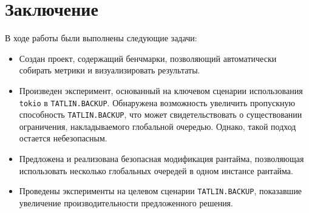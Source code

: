 
\section{Заключение}

В ходе работы были выполнены следующие задачи:

\begin{itemize}
    \item Создан проект, содержащий бенчмарки, позволяющий автоматически собирать метрики и визуализировать результаты.
    \item Произведен эксперимент, основанный на ключевом сценарии использования \verb|tokio| в \verb|TATLIN.BACKUP|. Обнаружена возможность увеличить пропускную способность \verb|TATLIN.BACKUP|, что может свидетельствовать о существовании ограничения, накладываемого глобальной очередью. Однако, такой подход остается небезопасным.
    \item Предложена и реализована безопасная модификация рантайма, позволяющая использовать несколько глобальных очередей в одном инстансе рантайма.
    \item Проведены эксперименты на целевом сценарии \verb|TATLIN.BACKUP|, показавшие увеличение производительности предложенного решения.
\end{itemize}
